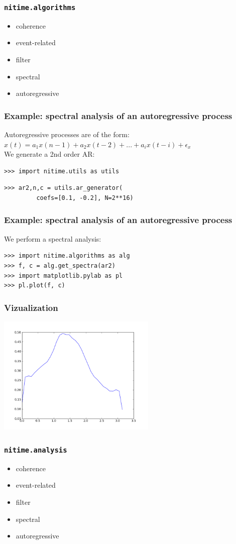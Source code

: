 \documentclass{beamer}
\begin{document}
\begin{frame}
\frametitle{\tt{nitime.algorithms}}
\begin{itemize}
\pause
\item
coherence
\pause
\item
event-related 
\pause
\item
filter
\pause
\item
spectral
\item
\pause
autoregressive
\end{itemize}
\end{frame}

\begin{frame}[fragile]
\frametitle{Example: spectral analysis of an autoregressive process}
Autoregressive processes are of the form: 
\pause
$x(t) = a_1x(n-1) + a_2x(t-2) + ... + a_ix(t-i) + \epsilon_x$
\\
\pause
We generate a 2nd order AR: 
\\
\pause
\begin{lstlisting}
>>> import nitime.utils as utils 
\end{lstlisting}
\begin{lstlisting}
>>> ar2,n,c = utils.ar_generator(
         coefs=[0.1, -0.2], N=2**16)
\end{lstlisting}
\end{frame}

\begin{frame}[fragile]
\frametitle{Example: spectral analysis of an autoregressive process}
We perform a spectral analysis:
\begin{lstlisting}
>>> import nitime.algorithms as alg
>>> f, c = alg.get_spectra(ar2)
>>> import matplotlib.pylab as pl 
>>> pl.plot(f, c)
\end{lstlisting}
\end{frame}

\begin{frame}
\frametitle{Vizualization}
\includegraphics[height=5.7cm]{figures/ar_spectrum}
\end{frame}


\begin{frame}
\frametitle{\tt{nitime.analysis}}
\begin{itemize}
\pause
\item
coherence
\pause
\item
event-related 
\pause
\item
filter
\pause
\item
spectral
\item
\pause
autoregressive
\end{itemize}
\end{frame}
\end{document}
